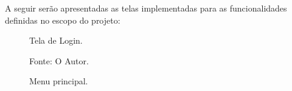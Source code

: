 A seguir serão apresentadas as telas implementadas para as funcionalidades definidas no escopo do projeto:


\begin{figure}[H]
    \begin{minipage}[b]{0.45\linewidth}
        \caption{Tela de Login.}
    	\centering %
    	\label{figura:login}
    	\caption*{Fonte: O Autor.}
    \end{minipage}
    \hspace{0.5cm}
    \begin{minipage}[b]{0.45\linewidth}
        \caption{Menu principal.}
    	\centering %

\end{minipage}
\end{figure}
